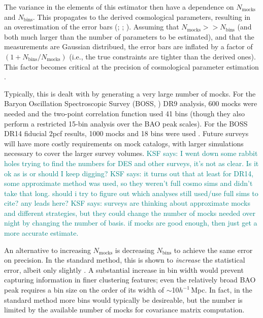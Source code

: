\documentclass[modern]{aastex62}
\newcommand{\cf}{2pcf\xspace} %
\newcommand{\hmpc}{$h^{-1}\,$Mpc}
\newcommand{\NN}[1]{N_\mathrm{#1}}
\newcommand{\KSF}[1]{\textcolor{teal}{KSF says: #1}}
\begin{document}
The variance in the elements of this estimator then have a dependence on $\NN{mocks}$ and $\NN{bins}$.
This propagates to the derived cosmological parameters, resulting in an overestimation of the error bars (\citealt{Hartlap2007}; \citealt{Dodelson2013} \citealt{Percival2014}; \citealt{TaylorJoachimi2014}).
Assuming that $\NN{mocks} >> \NN{bins}$ (and both much larger than the number of parameters to be estimated), and that the measurements are Gaussian distribued, the error bars are inflated by a factor of $(1 + \NN{bins}/\NN{mocks})$ (i.e., the true constraints are tighter than the derived ones).
This factor becomes critical at the precision of cosmological parameter estimation \citep{Percival2014}.

Typically, this is dealt with by generating a very large number of mocks.
For the Baryon Oscillation Spectroscopic Survey (BOSS, \citealt{Dawson2013}) DR9 analysis, 600 mocks were needed and the two-point correlation function used 41 bins \citep{Sanchez2012} (though they also perform a restricted 15-bin analysis over the BAO peak scales). For the BOSS DR14 fiducial \cf results, 1000 mocks and 18 bins were used \cite{Ata2017}.
Future surveys will have more costly requirements on mock catalogs, with larger simulations necessary to cover the larger survey volumes.
\KSF{I went down some rabbit holes trying to find the numbers for DES and other surveys, it's not as clear. Is it ok as is or should I keep digging?}
\KSF{it turns out that at least for DR14, some approximate method was used, so they weren't full cosmo sims and didn't take that long. should i try to figure out which analyses still used/use full sims to cite? any leads here?}
\KSF{surveys are thinking about approximate mocks and different strategies, but they could change the number of mocks needed over night by changing the number of basis. if mocks are good enough, then just get a more accurate estimate.}

An alternative to increasing $\NN{mocks}$ is decreasing $\NN{bins}$ to achieve the same error on precision.
In the standard method, this is shown to \emph{increase} the statistical error, albeit only slightly \citep{Percival2014}.
A substantial increase in bin width would prevent capturing information in finer clustering features; even the relatively broad BAO peak requires a bin size on the order of its width of $\sim$10\hmpc.
In fact, in the standard method more bins would typically be desireable, but the number is limited by the available number of mocks for covariance matrix computation.
\end{document}
